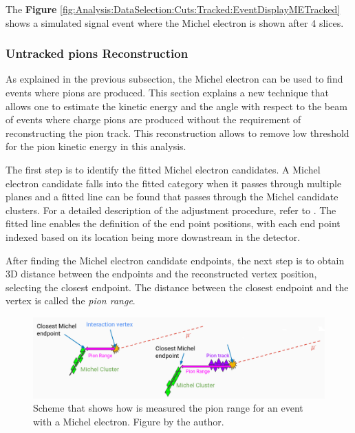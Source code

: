 The \textbf{Figure} \ref{fig:Analysis:DataSelection:Cuts:Tracked:EventDisplayMETracked} shows a simulated signal event where the Michel electron is shown after 4 slices. 

\subsubsection{Untracked pions Reconstruction}
\label{Cap:MnvExp:MnvDetector:DataReconstruction:Untrackedpions}

As explained in the previous subsection, the Michel electron can be used to find events where pions are produced. This section explains a new technique that allows one to estimate the kinetic energy and the angle with respect to the beam of events where charge pions are produced without the requirement of reconstructing the pion track. This reconstruction allows to remove low threshold for the pion kinetic energy in this analysis.
 
The first step is to identify the fitted Michel electron candidates. A Michel electron candidate falls into the fitted category when it passes through multiple planes and a fitted line can be found that passes through the Michel candidate clusters. For a detailed description of the adjustment procedure, refer to \cite{AaronThesis}. The fitted line enables the definition of the end point positions, with each end point indexed based on its location being more downstream in the detector.

After finding the Michel electron candidate endpoints, the next step is to obtain 3D distance between the endpoints and the reconstructed vertex position, selecting the closest endpoint. The distance between the closest endpoint and the vertex is called the \textit{pion range}. 

\begin{figure}
    \centering
    \includegraphics[scale=0.33]{Figures/Chapter4/DataSelection/TracklessPions.png}
    \caption{Scheme that shows how is measured the pion range for an event with a Michel electron. Figure by the author.}
    \label{fig:MnvExp:MnvDetector:DataReconstruction:UntrackedpionsMichelEventSheme}
\end{figure}


